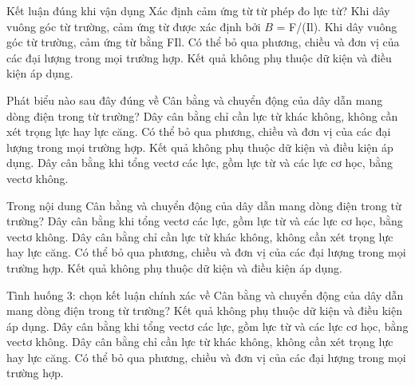 \begin{ex}
Kết luận đúng khi vận dụng Xác định cảm ứng từ từ phép đo lực từ?
\choice
{\True Khi dây vuông góc từ trường, cảm ứng từ được xác định bởi $B$ = F/(Il).}
{Khi dây vuông góc từ trường, cảm ứng từ bằng FIl.}
{Có thể bỏ qua phương, chiều và đơn vị của các đại lượng trong mọi trường hợp.}
{Kết quả không phụ thuộc dữ kiện và điều kiện áp dụng.}
\end{ex}

\begin{ex}
Phát biểu nào sau đây đúng về Cân bằng và chuyển động của dây dẫn mang dòng điện trong từ trường?
\choice
{Dây cân bằng chỉ cần lực từ khác không, không cần xét trọng lực hay lực căng.}
{Có thể bỏ qua phương, chiều và đơn vị của các đại lượng trong mọi trường hợp.}
{Kết quả không phụ thuộc dữ kiện và điều kiện áp dụng.}
{\True Dây cân bằng khi tổng vectơ các lực, gồm lực từ và các lực cơ học, bằng vectơ không.}
\end{ex}

\begin{ex}
Trong nội dung Cân bằng và chuyển động của dây dẫn mang dòng điện trong từ trường?
\choice
{\True Dây cân bằng khi tổng vectơ các lực, gồm lực từ và các lực cơ học, bằng vectơ không.}
{Dây cân bằng chỉ cần lực từ khác không, không cần xét trọng lực hay lực căng.}
{Có thể bỏ qua phương, chiều và đơn vị của các đại lượng trong mọi trường hợp.}
{Kết quả không phụ thuộc dữ kiện và điều kiện áp dụng.}
\end{ex}

\begin{ex}
Tình huống 3: chọn kết luận chính xác về Cân bằng và chuyển động của dây dẫn mang dòng điện trong từ trường?
\choice
{Kết quả không phụ thuộc dữ kiện và điều kiện áp dụng.}
{\True Dây cân bằng khi tổng vectơ các lực, gồm lực từ và các lực cơ học, bằng vectơ không.}
{Dây cân bằng chỉ cần lực từ khác không, không cần xét trọng lực hay lực căng.}
{Có thể bỏ qua phương, chiều và đơn vị của các đại lượng trong mọi trường hợp.}
\end{ex}

